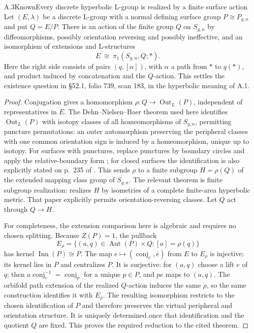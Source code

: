\begin{statement}{A.3}{Known}{Every discrete hyperbolic L-group is realized by a finite surface action}
Let $(E,\lambda)$ be a discrete L-group with a normal defining surface
group $P\cong P_{g,n}$ and put $Q=E/P$. There is an action of the finite
group $Q$ on $S_{g,n}$ by diffeomorphisms, possibly orientation reversing
and possibly ineffective, and an isomorphism of extensions and
L-structures
\[
 E\ \cong\ \pi_1(S_{g,n},Q;*).
\]
Here the right side consists of pairs $(q,[\alpha])$, with $\alpha$ a
path from $*$ to $q(*)$, and product induced by concatenation and the
$Q$-action. This settles the existence question in \S52.1, folio 739,
scan 183, in the hyperbolic meaning of A.1.
\end{statement}
\begin{proof}
Conjugation gives a homomorphism
$\rho:Q\to\operatorname{Out}_L(P)$, independent of representatives
in $E$. The Dehn--Nielsen--Baer theorem used here identifies
$\operatorname{Out}_L(P)$ with isotopy classes of all
homeomorphisms of $S_{g,n}$, permitting puncture permutations:
an outer automorphism preserving the peripheral classes with
one common orientation sign is induced by a homeomorphism,
unique up to isotopy. For surfaces with punctures, replace
punctures by boundary circles and apply the relative-boundary
form \citep[Theorem 2.3]{BeringQingWigglesworth2024};
for closed surfaces the identification is also explicitly
stated on p.~235 of \citet{Kerckhoff1983}.
This sends $\rho$ to a finite
subgroup $H=\rho(Q)$ of the extended mapping class group of $S_{g,n}$.
The relevant theorem is finite subgroup realization:
\citet[Theorem 5 and its finite-type extension in \S4; Theorem 7]{Kerckhoff1983}
realizes $H$ by isometries of a complete finite-area hyperbolic metric.
That paper explicitly permits orientation-reversing classes. Let $Q$
act through $Q\to H$.

For completeness, the extension comparison here is algebraic and
requires no chosen splitting. Because $Z(P)=1$, the pullback
\[
 E_\rho=\{(a,q)\in\operatorname{Aut}(P)\times Q:
                  [a]=\rho(q)\}
\]
has kernel $\operatorname{Inn}(P)\cong P$. The map
$e\mapsto(\operatorname{conj}_e,\overline e)$ from $E$ to $E_\rho$
is injective: its kernel lies in $P$ and centralizes $P$. It is
surjective: for $(a,q)$ choose a lift $e$ of $q$; then
$a\operatorname{conj}_e^{-1}=\operatorname{conj}_p$ for a unique
$p\in P$, and $pe$ maps to $(a,q)$. The orbifold path extension
of the realized $Q$-action induces the same $\rho$, so the same
construction identifies it with $E_\rho$. The resulting isomorphism
restricts to the chosen identification of $P$ and therefore preserves
the virtual peripheral and orientation structure. It is uniquely
determined once that identification and the quotient $Q$ are fixed.
This proves the required reduction to the cited theorem.
\end{proof}

